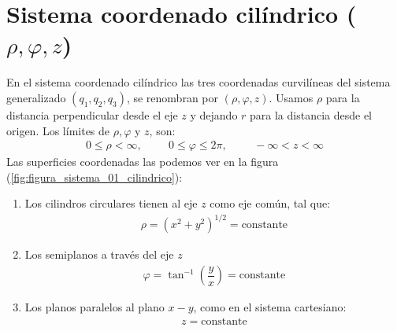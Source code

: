 \section{Sistema coordenado cilíndrico ($\rho, \varphi, z$)}
En el sistema coordenado cilíndrico las tres coordenadas curvilíneas del sistema generalizado $(q_{1}, q_{2}, q_{3})$, se renombran por $(\rho, \varphi, z)$. Usamos $\rho$ para la distancia perpendicular desde el eje $z$ y dejando $r$ para la distancia desde el origen. Los límites de $\rho, \varphi$ y $z$, son:
\begin{align*}
0 \leq \rho < \infty, \hspace{1cm} 0 \leq \varphi \leq 2 \pi, \hspace{1cm} -\infty < z < \infty
\end{align*}
Las superficies coordenadas las podemos ver en la figura (\ref{fig:figura_sistema_01_cilindrico}):
\begin{enumerate}
\item Los cilindros circulares tienen al eje $z$ como eje común, tal que:
\begin{align*}
\rho =  (x^{2} + y^{2})^{1/2} = \text{constante}
\end{align*}
\item Los semiplanos a través del eje $z$
\begin{align*}
\varphi = \tan^{-1} \left(\dfrac{y}{x} \right) = \text{constante}
\end{align*}
\item Los planos paralelos al plano $x-y$, como en el sistema cartesiano:
\begin{align*}
z = \text{constante}
\end{align*}
\end{enumerate}
